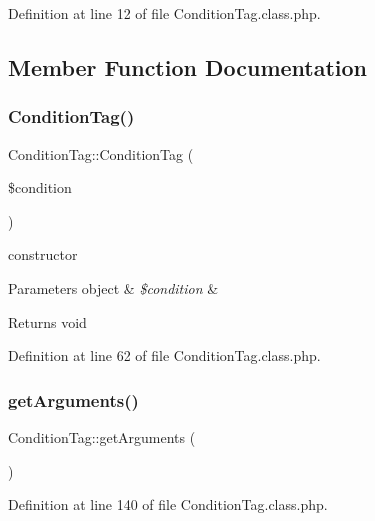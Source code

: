 Definition at line 12 of file Condition\+Tag.\+class.\+php.



\subsection{Member Function Documentation}
\hypertarget{classConditionTag_af1d7974cb56dd8757cdd1fe04fb1de7e}{}\label{classConditionTag_af1d7974cb56dd8757cdd1fe04fb1de7e} 
\subsubsection{\texorpdfstring{Condition\+Tag()}{ConditionTag()}}
{\footnotesize\ttfamily Condition\+Tag\+::\+Condition\+Tag (\begin{DoxyParamCaption}\item[{}]{\$condition }\end{DoxyParamCaption})}

constructor 
\begin{DoxyParams}[1]{Parameters}
object & {\em \$condition} & \\
\hline
\end{DoxyParams}
\begin{DoxyReturn}{Returns}
void 
\end{DoxyReturn}


Definition at line 62 of file Condition\+Tag.\+class.\+php.

\hypertarget{classConditionTag_ad9c04c50390c7394e66a565e9afa456a}{}\label{classConditionTag_ad9c04c50390c7394e66a565e9afa456a} 
\subsubsection{\texorpdfstring{get\+Arguments()}{getArguments()}}
{\footnotesize\ttfamily Condition\+Tag\+::get\+Arguments (\begin{DoxyParamCaption}{ }\end{DoxyParamCaption})}



Definition at line 140 of file Condition\+Tag.\+class.\+php.

\hypertarget{classConditionTag_a0ba99a5ac27c8051ddf617306a89fadf}{}\label{classConditionTag_a0ba99a5ac27c8051ddf617306a89fadf} 
